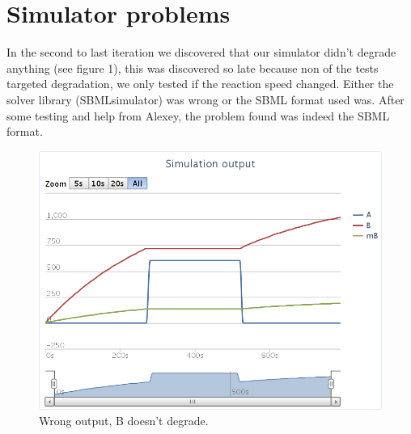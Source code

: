 \documentclass[a4paper]{article}
\begin{document}
\section*{Simulator problems}
In the second to last iteration we discovered that our simulator didn't degrade anything (see figure 1), this was discovered so late because non of the tests targeted degradation, we only tested if the reaction speed changed. Either the solver library (SBMLsimulator) was wrong or the SBML format used was. After some testing and help from Alexey, the problem found was indeed the SBML format.\\

\begin{figure}[h!]
	\centering\includegraphics[scale=0.35]{../../screenshots/2012-05-31-not-output.png}
	\caption{Wrong output, B doesn't degrade.}
\end{figure}
\end{document}
